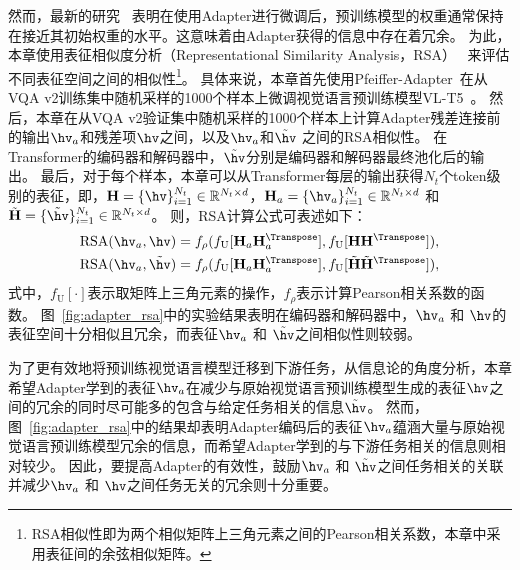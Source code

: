 然而，最新的研究~\cite{he2021effectiveness} 表明在使用Adapter进行微调后，预训练模型的权重通常保持在接近其初始权重的水平。这意味着由Adapter获得的信息中存在着冗余。
为此，本章使用表征相似度分析（Representational Similarity Analysis，RSA）~\cite{laakso2000content} 来评估不同表征空间之间的相似性\footnote[1]{RSA相似性即为两个相似矩阵上三角元素之间的Pearson相关系数，本章中采用表征间的余弦相似矩阵。}。
具体来说，本章首先使用Pfeiffer-Adapter~\cite{pfeiffer2020adapterfusion}在从VQA v2训练集中随机采样的1000个样本上微调视觉语言预训练模型VL-T5~\cite{cho2021unifying}。
然后，本章在从VQA v2验证集中随机采样的1000个样本上计算Adapter残差连接前的输出$\hv_a$和残差项$\hv$之间，以及$\hv_a$和$\tilde{\hv}$ 之间的RSA相似性。
在Transformer的编码器和解码器中，$\tilde{\hv}$分别是编码器和解码器最终池化后的输出。
最后，对于每个样本，本章可以从Transformer每层的输出获得$N_t$个token级别的表征，即，$\mathbf{H} = \{\hv\}_{i=1}^{N_t} \in \mathbb{R}^{N_t\times d}$，$\mathbf{H}_a = \{\hv_a\}_{i=1}^{N_t}  \in \mathbb{R}^{N_t\times d}$ 和 $\tilde{\mathbf{H}} = \{\tilde{\hv}\}_{i=1}^{N_t}  \in \mathbb{R}^{N_t\times d}$。
则，RSA计算公式可表述如下：
\begin{align} 
&\text{RSA}(\hv_a, \hv) = f_{\rho}(f_{\text{U}}[\mathbf{H}_a \mathbf{H}_a^{\Transpose}], f_{\text{U}}[\mathbf{H} \mathbf{H}^{\Transpose}]), \\
&\text{RSA}(\hv_a, \tilde{\hv}) = f_{\rho}(f_{\text{U}}[\mathbf{H}_a \mathbf{H}_a^{\Transpose}], f_{\text{U}}[\tilde{\mathbf{H}} \tilde{\mathbf{H}}^{\Transpose}]),
\label{eq:adapter_rsa} 
\end{align}
式中，$f_{\text{U}}\left[\cdot\right]$表示取矩阵上三角元素的操作，$f_{\rho}$表示计算Pearson相关系数的函数。
图~\ref{fig:adapter_rsa}中的实验结果表明在编码器和解码器中，$\hv_a$ 和 $\hv$的表征空间十分相似且冗余，而表征$\hv_a$ 和 $\tilde{\hv}$之间相似性则较弱。


为了更有效地将预训练视觉语言模型迁移到下游任务，从信息论的角度分析，本章希望Adapter学到的表征$\hv_a$在减少与原始视觉语言预训练模型生成的表征$\hv$之间的冗余的同时尽可能多的包含与给定任务相关的信息$\tilde{\hv}$。
然而，图~\ref{fig:adapter_rsa}中的结果却表明Adapter编码后的表征$\hv_a$蕴涵大量与原始视觉语言预训练模型冗余的信息，而希望Adapter学到的与下游任务相关的信息则相对较少。
因此，要提高Adapter的有效性，鼓励$\hv_a$ 和 $\tilde{\hv}$之间任务相关的关联并减少$\hv_a$ 和 $\hv$之间任务无关的冗余则十分重要。



